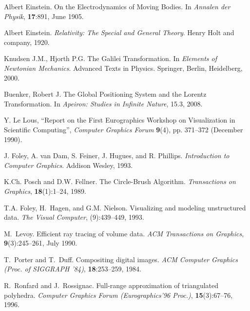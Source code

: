 \documentclass{egpubl}
\begin{document}
\begin{thebibliography}{1}
 Albert Einstein.
\newblock On the Electrodynamics of Moving Bodies.
In \emph{Annalen der Physik}, \textbf{17}:891, June 1905.

 Albert Einstein.
\newblock \emph{Relativity: The Special and General Theory}.
Henry Holt and company, 1920.

 Knudsen J.M., Hjorth P.G. The Galilei Transformation.
In \emph{Elements of Newtonian Mechanics}. Advanced Texts in Physics. Springer, Berlin, Heidelberg, 2000.

 Buenker, Robert J.
\newblock The Global Positioning System and the Lorentz Transformation.
In \emph{Apeiron: Studies in Infinite Nature}, 15.3, 2008.


 Y. Le Lous,
``Report on the First Eurographics Workshop on Visualization in
Scientific Computing'', \emph{Computer Graphics Forum\/}
\textbf{9}(4), pp. 371--372 (December 1990).

J. Foley, A. van Dam, S. Feiner, J. Hugues, and R. Phillips.
\newblock \emph{Introduction to Computer Graphics}.
\newblock Addison Wesley, 1993.

K.Ch. Posch and D.W. Fellner.
\newblock The Circle-Brush Algorithm.
\newblock \emph{Transactions on Graphics}, \textbf{18}(1):1--24, 1989.

T.A. Foley, H.~Hagen, and G.M. Nielson.
\newblock Visualizing and modeling unstructured data.
\newblock \emph{The Visual Computer}, (9):439--449, 1993.

M.~Levoy.
\newblock Efficient ray tracing of volume data.
\newblock \emph{ACM Transactions on Graphics},
          \textbf{9}(3):245--261, July 1990.

T.~Porter and T.~Duff.
\newblock Compositing digital images.
\newblock \emph{ACM Computer Graphics (Proc. of SIGGRAPH '84)},
          \textbf{18}:253--259, 1984.

R.~Ronfard and J.~Rossignac.
\newblock Full-range approximation of triangulated polyhedra.
\newblock \emph{Computer Graphics Forum (Eurographics'96 Proc.)},
          \textbf{15}(3):67--76, 1996.

\end{thebibliography}
\end{document}
